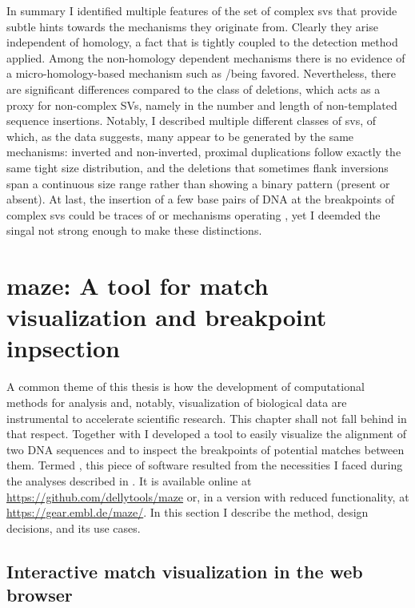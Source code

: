 In summary I identified multiple features of the set of complex \acp{sv} that
provide subtle hints towards the mechanisms they originate from. Clearly they
arise independent of homology, a fact that is tightly coupled to the detection
method applied. Among the non-homology dependent mechanisms there is no evidence
of a micro-homology-based mechanism such as \fostes/\mmbir being favored.
Nevertheless, there are significant differences compared to the class of
deletions, which acts as a proxy for non-complex SVs, namely in the number and
length of non-templated sequence insertions. Notably, I described multiple
different classes of \acp{sv}, of which, as the data suggests, many appear to be
generated by the same mechanisms: inverted and non-inverted, proximal
duplications follow exactly the same tight size distribution, and the deletions
that sometimes flank inversions span a continuous size range rather than showing
a binary pattern (present or absent). At last, the insertion of a few base pairs
of DNA at the breakpoints of complex \acp{sv} could be traces of \nhej or \bir
mechanisms operating \citep{Hastings2009,Carvalho2016}, yet I deemded the singal
not strong enough to make these distinctions.







\section{\texorpdfstring{\acs{maze}}{Maze}: A tool for match visualization and breakpoint inpsection}
\label{sec:maze}

A common theme of this thesis is how the development of computational methods
for analysis and, notably, visualization of biological data are instrumental to
accelerate scientific research. This chapter shall not fall behind in that
respect. Together with \markus I developed a tool to easily visualize the
alignment of two DNA sequences and to inspect the breakpoints of potential
matches between them. Termed \maze, this piece of software resulted from the
necessities I faced during the analyses described in
. It is available online at
\url{https://github.com/dellytools/maze} or, in a version with reduced
functionality, at \url{https://gear.embl.de/maze/}. In this section I describe
the method, design decisions, and its use cases.




\subsection{Interactive match visualization in the web browser}
\label{sec:maze_dotplot}

